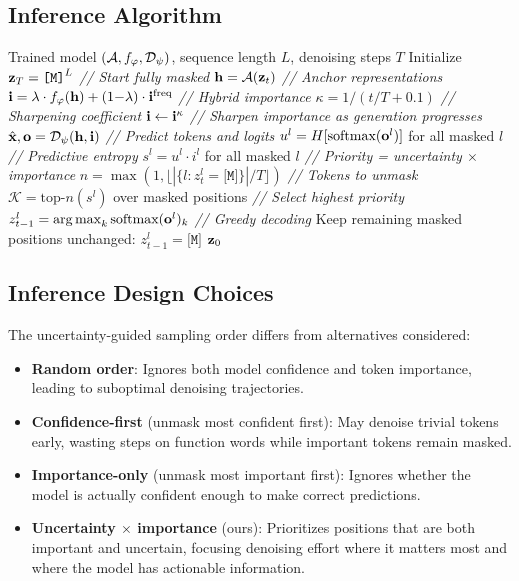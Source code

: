 \subsection{Inference Algorithm}

\begin{algorithm}[H]
\caption{ATAT Generation with Uncertainty-Guided Sampling}
\label{alg:atat-generate}
\begin{algorithmic}[1]
\REQUIRE Trained model $(\mathcal{A}, f_\varphi, \mathcal{D}_\psi)$, sequence length $L$, denoising steps $T$
\STATE Initialize $\mathbf{z}_T = \texttt{[M]}^L$ \hfill \textit{// Start fully masked}
    \STATE $\mathbf{h} = \mathcal{A}(\mathbf{z}_t)$ \hfill \textit{// Anchor representations}
    \STATE $\mathbf{i} = \lambda \cdot f_\varphi(\mathbf{h}) + (1{-}\lambda) \cdot \mathbf{i}^{\text{freq}}$ \hfill \textit{// Hybrid importance}
    \STATE $\kappa = 1/(t/T + 0.1)$ \hfill \textit{// Sharpening coefficient}
    \STATE $\mathbf{i} \leftarrow \mathbf{i}^{\kappa}$ \hfill \textit{// Sharpen importance as generation progresses}
    \STATE $\hat{\mathbf{x}}, \mathbf{o} = \mathcal{D}_\psi(\mathbf{h}, \mathbf{i})$ \hfill \textit{// Predict tokens and logits}
    \STATE $u^l = H[\text{softmax}(\mathbf{o}^l)]$ for all masked $l$ \hfill \textit{// Predictive entropy}
    \STATE $s^l = u^l \cdot i^l$ for all masked $l$ \hfill \textit{// Priority = uncertainty $\times$ importance}
    \STATE $n = \max(1, \lfloor |\{l: z^l_t = \texttt{[M]}\}| / T \rfloor)$ \hfill \textit{// Tokens to unmask}
    \STATE $\mathcal{K} = \text{top-}n(s^l)$ over masked positions \hfill \textit{// Select highest priority}
        \STATE $z^l_{t-1} = \operatorname*{arg\,max}_k \text{softmax}(\mathbf{o}^l)_k$ \hfill \textit{// Greedy decoding}
    \ENDFOR
    \STATE Keep remaining masked positions unchanged: $z^l_{t-1} = \texttt{[M]}$
\ENDFOR
\RETURN $\mathbf{z}_0$
\end{algorithmic}
\end{algorithm}

\subsection{Inference Design Choices}

The uncertainty-guided sampling order differs from alternatives considered:
\begin{itemize}
    \item \textbf{Random order}: Ignores both model confidence and token importance, leading to suboptimal denoising trajectories.
    \item \textbf{Confidence-first} (unmask most confident first): May denoise trivial tokens early, wasting steps on function words while important tokens remain masked.
    \item \textbf{Importance-only} (unmask most important first): Ignores whether the model is actually confident enough to make correct predictions.
    \item \textbf{Uncertainty $\times$ importance} (ours): Prioritizes positions that are both important and uncertain, focusing denoising effort where it matters most and where the model has actionable information.
\end{itemize}

